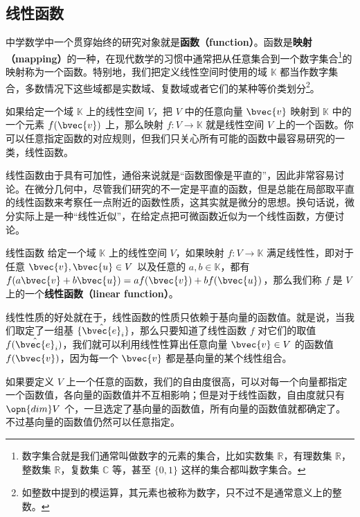 


\subsection{线性函数}

中学数学中一个贯穿始终的研究对象就是\textbf{函数（function）}。函数是\textbf{映射（mapping）}的一种，在现代数学的习惯中通常把从任意集合到一个数字集合\footnote{数字集合就是我们通常叫做数字的元素的集合，比如实数集 $\mathbb{R}$，有理数集 $\mathbb{R}$，整数集 $\mathbb{R}$，复数集 $\mathbb{C}$ 等，甚至 $\{0, 1\}$ 这样的集合都叫数字集合。}的映射称为一个函数。特别地，我们把定义线性空间时使用的域 $\mathbb{K}$ 都当作数字集合，多数情况下这些域都是实数域、复数域或者它们的某种等价类划分\footnote{如整数中提到的模运算，其元素也被称为数字，只不过不是通常意义上的整数。}。

如果给定一个域 $\mathbb{K}$ 上的线性空间 $V$，把 $V$ 中的任意向量 $\bvec{v}$ 映射到 $\mathbb{K}$ 中的一个元素 $f(\bvec{v})$ 上，那么映射 $f:V\rightarrow\mathbb{K}$ 就是线性空间 $V$ 上的一个函数。你可以任意指定函数的对应规则，但我们只关心所有可能的函数中最容易研究的一类，线性函数。

线性函数由于具有可加性，通俗来说就是“函数图像是平直的”，因此非常容易讨论。在微分几何中，尽管我们研究的不一定是平直的函数，但是总能在局部取平直的线性函数来考察任一点附近的函数性质，这其实就是微分的思想。换句话说，微分实际上是一种“线性近似”，在给定点把可微函数近似为一个线性函数，方便讨论。

\begin{definition}{线性函数}\label{def_DualSp_3}
给定一个域 $\mathbb{K}$ 上的线性空间 $V$，如果映射 $f:V\rightarrow\mathbb{K}$ 满足线性性，即对于任意 $\bvec{v}, \bvec{u}\in V$ 以及任意的 $a, b\in\mathbb{K}$，都有 $f(a\bvec{v}+b\bvec{u})=af(\bvec{v})+bf(\bvec{u})$，那么我们称 $f$ 是 $V$ 上的一个\textbf{线性函数（linear function）}。
\end{definition}

线性性质的好处就在于，线性函数的性质只依赖于基向量的函数值。就是说，当我们取定了一组基 $\{\hat{\bvec{e}}_i\}$，那么只要知道了线性函数 $f$ 对它们的取值 $f(\hat{\bvec{e}}_i)$，我们就可以利用线性性算出任意向量 $\bvec{v}\in V$ 的函数值 $f(\bvec{v})$，因为每一个 $\bvec{v}$ 都是基向量的某个线性组合。

如果要定义 $V$ 上一个任意的函数，我们的自由度很高，可以对每一个向量都指定一个函数值，各向量的函数值并不互相影响；但是对于线性函数，自由度就只有 $\opn{dim} V$ 个，一旦选定了基向量的函数值，所有向量的函数值就都确定了。不过基向量的函数值仍然可以任意指定。

